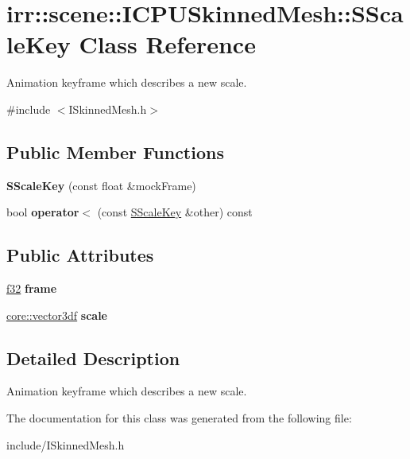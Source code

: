 \hypertarget{classirr_1_1scene_1_1ICPUSkinnedMesh_1_1SScaleKey}{}\section{irr\+:\+:scene\+:\+:I\+C\+P\+U\+Skinned\+Mesh\+:\+:S\+Scale\+Key Class Reference}
\label{classirr_1_1scene_1_1ICPUSkinnedMesh_1_1SScaleKey}


Animation keyframe which describes a new scale.  




{\ttfamily \#include $<$I\+Skinned\+Mesh.\+h$>$}

\subsection*{Public Member Functions}
\begin{DoxyCompactItemize}
\item 
{\bfseries S\+Scale\+Key} (const float \&mock\+Frame)\hypertarget{classirr_1_1scene_1_1ICPUSkinnedMesh_1_1SScaleKey_a8c480e0ecf4a5d1697d55e85235cf08c}{}\label{classirr_1_1scene_1_1ICPUSkinnedMesh_1_1SScaleKey_a8c480e0ecf4a5d1697d55e85235cf08c}

\item 
bool {\bfseries operator$<$} (const \hyperlink{classirr_1_1scene_1_1ICPUSkinnedMesh_1_1SScaleKey}{S\+Scale\+Key} \&other) const \hypertarget{classirr_1_1scene_1_1ICPUSkinnedMesh_1_1SScaleKey_a17d538b7fe5d8dbbe81e4e9c26602b5d}{}\label{classirr_1_1scene_1_1ICPUSkinnedMesh_1_1SScaleKey_a17d538b7fe5d8dbbe81e4e9c26602b5d}

\end{DoxyCompactItemize}
\subsection*{Public Attributes}
\begin{DoxyCompactItemize}
\item 
\hyperlink{namespaceirr_a0277be98d67dc26ff93b1a6a1d086b07}{f32} {\bfseries frame}\hypertarget{classirr_1_1scene_1_1ICPUSkinnedMesh_1_1SScaleKey_a24ccbefc566d2943884934e02e108104}{}\label{classirr_1_1scene_1_1ICPUSkinnedMesh_1_1SScaleKey_a24ccbefc566d2943884934e02e108104}

\item 
\hyperlink{namespaceirr_1_1core_a06f169d08b5c429f5575acb7edbad811}{core\+::vector3df} {\bfseries scale}\hypertarget{classirr_1_1scene_1_1ICPUSkinnedMesh_1_1SScaleKey_af6fec771a66e9a6955167ad0480dd1a9}{}\label{classirr_1_1scene_1_1ICPUSkinnedMesh_1_1SScaleKey_af6fec771a66e9a6955167ad0480dd1a9}

\end{DoxyCompactItemize}


\subsection{Detailed Description}
Animation keyframe which describes a new scale. 

The documentation for this class was generated from the following file\+:\begin{DoxyCompactItemize}
\item 
include/I\+Skinned\+Mesh.\+h\end{DoxyCompactItemize}
